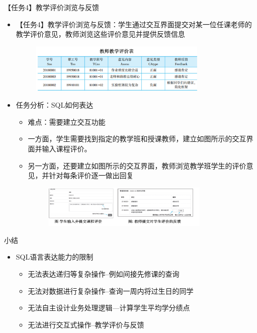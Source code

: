 \begin{frame}[allowframebreaks]{【任务4】教学评价浏览与反馈}
\begin{itemize}
    \item 【任务4】教学评价浏览与反馈：学生通过交互界面提交对某一位任课老师的教学评价意见，教师浏览这些评价意见并提供反馈信息
\begin{figure}
    \centering
    \includegraphics[width=0.8\textwidth]{figure/fig-6.jpg}
\end{figure}
\framebreak
    \item 任务分析：SQL如何表达
\begin{itemize}
    \item 难点：需要建立交互功能
    \item 一方面，学生需要找到指定的教学班和授课教师，建立如图所示的交互界面并输入课程评价。
    \item 另一方面，还要建立如图所示的交互界面，教师浏览教学班学生的评价意见，并针对每条评价逐一做出回复
\begin{figure}
    \centering
    \includegraphics[width=0.8\textwidth]{figure/fig-7.jpg}
\end{figure}

\end{itemize}
\end{itemize}
\end{frame}

\begin{frame}[allowframebreaks]{小结}
\begin{itemize}
    \item SQL语言表达能力的限制
\begin{itemize}
\item 无法表达递归等复杂操作--例如间接先修课的查询
\item 无法对数据进行复杂操作--查询一周内将过生日的同学
\item 无法自主设计业务处理逻辑—计算学生平均学分绩点
\item 无法进行交互式操作--教学评价与反馈
\end{itemize}


\end{itemize}
\end{frame}


